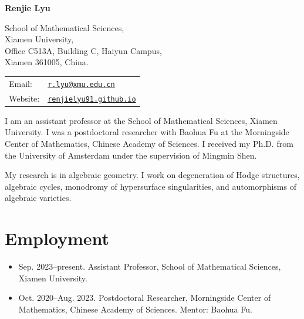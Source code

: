 \documentclass[letterpaper]{article}
\def\name{Renjie Lyu}
\begin{document}
\centerline{\huge \bf \name}


\vspace{0.25in}

\begin{minipage}{0.45\linewidth}
  School of Mathematical Sciences,\\
  Xiamen University,\\
  Office C513A, Building C, Haiyun Campus,\\
  Xiamen 361005, China.
\end{minipage}
\begin{minipage}{0.45\linewidth}
  \begin{tabular}{ll}
    Email: & \href{mailto:r.lyu@xmu.edu.cn}{\tt r.lyu@xmu.edu.cn} \\
    Website: & \href{https://renjielyu91.github.io/}{\tt renjielyu91.github.io}\\
  \end{tabular}
\end{minipage}
\vspace{2em}

  I am an assistant professor at the School of Mathematical Sciences,
  Xiamen University. I was a postdoctoral researcher with Baohua Fu at the
  Morningside Center of Mathematics, Chinese Academy of Sciences. I received
  my Ph.D. from the University of Amsterdam under the supervision of Mingmin Shen.

  My research is in algebraic geometry. I work on degeneration of Hodge structures,
  algebraic cycles, monodromy of hypersurface singularities, and automorphisms of algebraic varieties.

\section*{Employment}

  \begin{itemize}

    \item Sep. 2023--present. Assistant Professor, School of Mathematical Sciences,
    Xiamen University.

    \item Oct. 2020--Aug. 2023. Postdoctoral Researcher, Morningside Center of
    Mathematics, Chinese Academy of Sciences. Mentor: Baohua Fu.

  \end{itemize}
\end{document}
